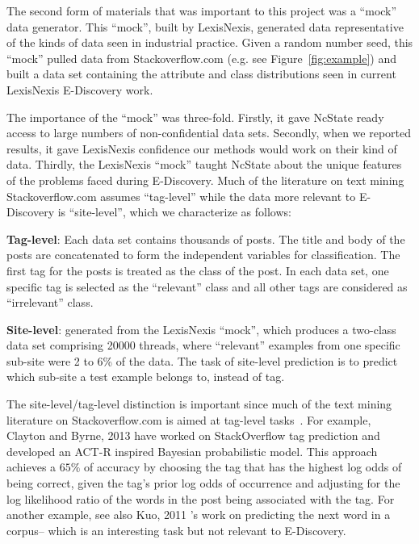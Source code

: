 \documentclass{sig-alternate-05-2015}
\newcommand{\bi}{\begin{itemize*}}
\newcommand{\ei}{\end{itemize*}}
\newcommand{\fig}[1]{Figure~\ref{fig:#1}}
\theoremstyle{break}
\begin{document}
The second form of materials that was important
to this project was a  ``mock'' data generator.
This ``mock'', built by LexisNexis, generated   data  
representative of the kinds of data seen in industrial practice. 
Given a random number seed, this ``mock'' pulled
data from Stackoverflow.com (e.g. see \fig{example})
and built
a data set  containing the attribute
and class distributions seen in current LexisNexis E-Discovery work.

The importance of the ``mock'' was three-fold. Firstly, it gave NcState ready access to large
numbers of non-confidential data sets. Secondly, when we reported results, it gave LexisNexis confidence
our methods would work on their kind of data.
Thirdly, the LexisNexis ``mock'' taught  NcState about the unique features of
the problems faced during E-Discovery.
Much of the literature on text mining Stackoverflow.com
assumes ``tag-level'' while the data more relevant to E-Discovery
is ``site-level'', which we characterize as follows:
\bi
\item
{\bf Tag-level}:   Each data set contains  thousands of posts. The title and body of the posts are concatenated to form the independent variables for classification. The first tag for the posts is treated as the class of the post. In each data set, one specific tag is selected as the ``relevant'' class and all other tags are considered as ``irrelevant'' class.
\item
{\bf Site-level}: generated from the LexisNexis ``mock'', 
which produces a two-class data set comprising 20000 threads, where
 ``relevant''
examples from one specific sub-site were 2 to 6\% of the data. The task of site-level prediction is to predict which sub-site a test example belongs to, instead of tag.
\ei
The site-level/tag-level distinction is important since much of
the text mining literature on Stackoverflow.com is
aimed at tag-level tasks~\cite{moharanatag,stanley2013predicting,kuo2011word}. For example, Clayton and Byrne, 2013 \cite{stanley2013predicting} have worked on StackOverflow tag prediction and developed an ACT-R inspired Bayesian probabilistic model. This approach achieves a $65\%$ of accuracy by choosing the tag that has the highest log odds of being correct, given the tag's prior log odds of occurrence and adjusting for the log likelihood ratio of the words in the post being associated with the tag.
For another example,  see also Kuo, 2011 \cite{kuo2011word}'s work on predicting the next word in a corpus-- which is an interesting
task but not relevant to E-Discovery.
\end{document}
